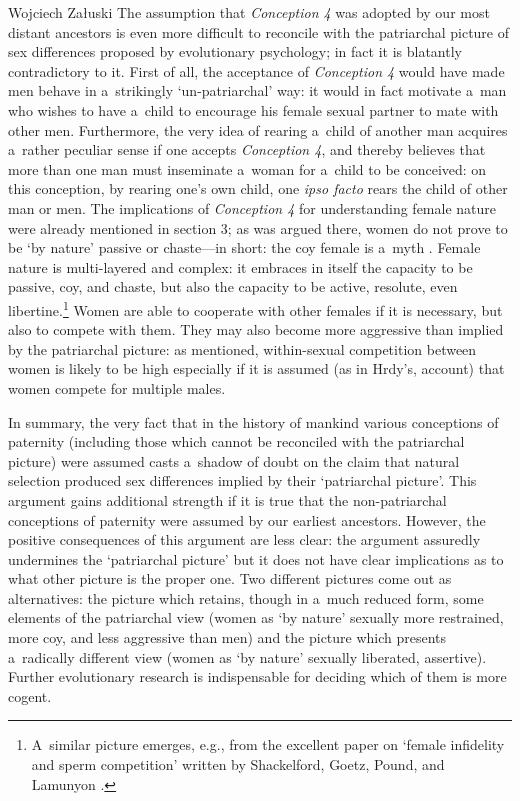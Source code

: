 \begin{artengenv}{Wojciech Załuski}
The assumption that \textit{Conception 4} was adopted by our most distant ancestors is even more difficult to reconcile with the patriarchal picture of sex differences proposed by evolutionary psychology; in fact it is blatantly contradictory to it. First of all, the acceptance of \textit{Conception 4} would have made men behave in a~strikingly ‘un-patriarchal' way: it would in fact motivate a~man who wishes to have a~child to encourage his female sexual partner to mate with other men. Furthermore, the very idea of rearing a~child of another man acquires a~rather peculiar sense if one accepts \textit{Conception 4}, and thereby believes that more than one man must inseminate a~woman for a~child to be conceived: on this conception, by rearing one's own child, one \textit{ipso facto} rears the child of other man or men. The implications of \textit{Conception 4} for understanding female nature were already mentioned in section 3; as was argued there, women do not prove to be ‘by nature' passive or chaste---in short: the coy female is a~myth
\parencite[cf.][]{hrdy_empathy_1986}. %
 Female nature is multi-layered and complex: it embraces in itself the capacity to be passive, coy, and chaste, but also the capacity to be active, resolute, even libertine.\footnote{A~similar picture emerges, e.g., from the excellent paper on ‘female infidelity and sperm competition' written by Shackelford, Goetz, Pound, and Lamunyon 
\parencite*[][]{shackelford_female_2015}.%
} Women are able to cooperate with other females if it is necessary, but also to compete with them. They may also become more aggressive than implied by the patriarchal picture: as mentioned, within-sexual competition between women is likely to be high especially if it is assumed (as in Hrdy's, account) that women compete for multiple males.

In summary, the very fact that in the history of mankind various conceptions of paternity (including those which cannot be reconciled with the patriarchal picture) were assumed casts a~shadow of doubt on the claim that natural selection produced sex differences implied by their ‘patriarchal picture'. This argument gains additional strength if it is true that the non-patriarchal conceptions of paternity were assumed by our earliest ancestors. However, the positive consequences of this argument are less clear: the argument assuredly undermines the ‘patriarchal picture' but it does not have clear implications as to what other picture is the proper one. Two different pictures come out as alternatives: the picture which retains, though in a~much reduced form, some elements of the patriarchal view (women as ‘by nature' sexually more restrained, more coy, and less aggressive than men) and the picture which presents a~radically different view (women as ‘by nature' sexually liberated, assertive). Further evolutionary research is indispensable for deciding which of them is more cogent.

\end{artengenv}
